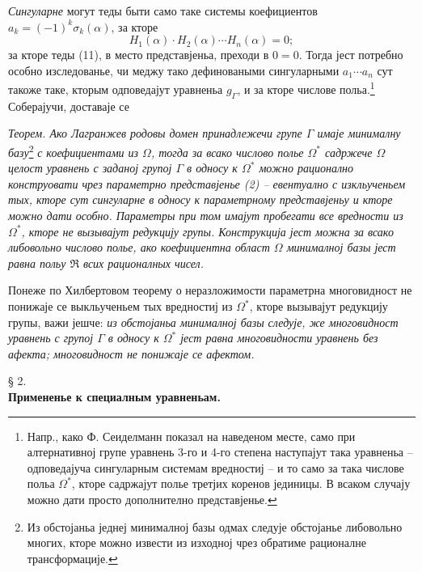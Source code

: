﻿\documentclass[11pt]{article}
\begin{document}
{\itshape Сингуларне} могут теды быти само таке системы коефициентов $a_k=(-1)^k\sigma_k(\alpha)$, за кторе
\[
H_1(\alpha)\cdot H_2(\alpha)\cdots H_n(\alpha)=0;
\]
за кторе теды (11), в место представјеньа, преходи в $0=0$. Тогда јест потребно особно изследованье, чи меджу тако дефиноваными сингуларными $a_1\cdots a_n$ сут такоже таке, кторым одповедајут уравненьа $g_\Gamma$, и за кторе числове польа.\footnote{Напр., како Ф. Сеиделманн показал на наведеном месте, само при алтернативној групе уравнень 3-го и 4-го степена наступајут така уравненьа -- одповедајуча сингуларным системам вредностиј -- и то само за така числове польа $\Omega^*$, кторе садржајут полье третјих коренов јединицы. В всаком случају можно дати просто дополнително представјенье.} Соберајучи, доставаје се

{\itshape Теорем. Ако Лагранжев родовы домен принадлежечи групе $\Gamma$ имаје минималну базу}\footnote{Из обстојаньа једнеј минималној базы одмах следује обстојанье либовольно многих, кторе можно извести из изходној чрез обратиме рационалне трансформације.} {\itshape с коефициентами из $\Omega$, тогда за всако числово полье $\Omega^*$ садржече $\Omega$ целост уравнень с заданој групој $\Gamma$ в односу к $\Omega^*$ можно рационално конструовати чрез параметрно представјенье (2) -- евентуално с изкльученьем тых, кторе сут сингуларне в односу к параметрному представјеньу и кторе можно дати особно. Параметры при том имајут пробегати все вредности из $\Omega^*$, кторе не вызывајут редукцију групы. Конструкција јест можна за всако либовольно числово полье, ако коефициентна област $\Omega$ минималној базы јест равна польу $\mathfrak R$ всих рационалных чисел.}

Понеже по Хилбертовом теорему о неразложимости параметрна многовидност не понижаје се выкльученьем тых вредностиј из $\Omega^*$, кторе вызывајут редукцију групы, важи јешче: {\itshape из обстојаньа минималној базы следује, же многовидност уравнень с групој $\Gamma$ в односу к $\Omega^*$ јест равна многовидности уравнень без афекта; многовидност не понижаје се афектом.}

\begin{center}
§ 2.\\[0.75\baselineskip]
\textbf{Примененье к специалным уравненьам.}
\end{center}
\end{document}
